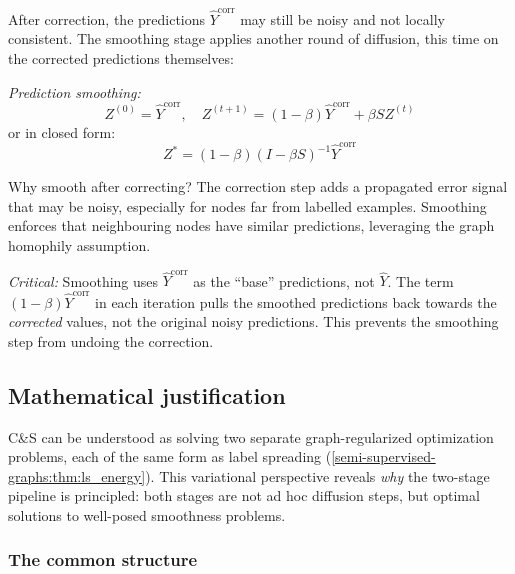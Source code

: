 \begin{notechapter}
After correction, the predictions $\hat{Y}^{\text{corr}}$ may still be noisy
and not locally consistent. The smoothing stage applies another round of
diffusion, this time on the corrected predictions themselves:

\begin{keyidea}
\emph{Prediction smoothing:}
\begin{equation}
Z^{(0)} = \hat{Y}^{\text{corr}}, \quad Z^{(t+1)} = (1-\beta) \hat{Y}^{\text{corr}} + \beta S Z^{(t)}
\end{equation}
or in closed form:
\begin{equation}
Z^* = (1-\beta)(I - \beta S)^{-1} \hat{Y}^{\text{corr}}
\end{equation}
\end{keyidea}

Why smooth after correcting? The correction step adds a propagated error signal
that may be noisy, especially for nodes far from labelled examples. Smoothing
enforces that neighbouring nodes have similar predictions, leveraging the graph
homophily assumption.

\begin{pitfall}
\emph{Critical:} Smoothing uses $\hat{Y}^{\text{corr}}$ as the ``base''
predictions, not $\hat{Y}$. The term $(1-\beta)\hat{Y}^{\text{corr}}$ in each
iteration pulls the smoothed predictions back towards the \emph{corrected} values,
not the original noisy predictions. This prevents the smoothing step from
undoing the correction.
\end{pitfall}

\subsection{Mathematical justification}

C\&S can be understood as solving two separate graph-regularized optimization
problems, each of the same form as label spreading
(\cref{semi-supervised-graphs:thm:ls_energy}). This variational perspective reveals \emph{why}
the two-stage pipeline is principled: both stages are not ad hoc diffusion
steps, but optimal solutions to well-posed smoothness problems.

\subsubsection*{The common structure}


\end{notechapter}
